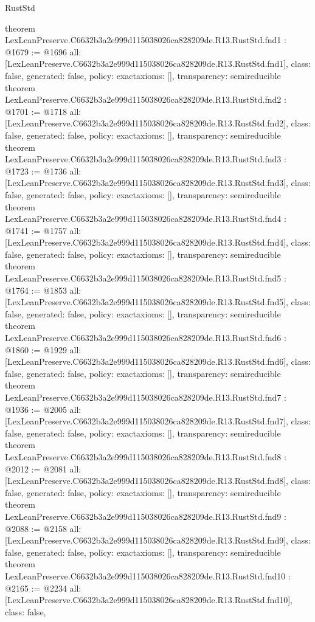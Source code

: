 \begin{lexlean}{RustStd}
\begin{coremodule}
{}
theorem LexLeanPreserve.C6632b3a2e999d115038026ca828209de.R13.RustStd.fnd1 : @1679 := @1696 {
  all: [LexLeanPreserve.C6632b3a2e999d115038026ca828209de.R13.RustStd.fnd1],
  class: false,
  generated: false,
  policy: exact{axioms: []},
  transparency: semireducible
}
theorem LexLeanPreserve.C6632b3a2e999d115038026ca828209de.R13.RustStd.fnd2 : @1701 := @1718 {
  all: [LexLeanPreserve.C6632b3a2e999d115038026ca828209de.R13.RustStd.fnd2],
  class: false,
  generated: false,
  policy: exact{axioms: []},
  transparency: semireducible
}
theorem LexLeanPreserve.C6632b3a2e999d115038026ca828209de.R13.RustStd.fnd3 : @1723 := @1736 {
  all: [LexLeanPreserve.C6632b3a2e999d115038026ca828209de.R13.RustStd.fnd3],
  class: false,
  generated: false,
  policy: exact{axioms: []},
  transparency: semireducible
}
theorem LexLeanPreserve.C6632b3a2e999d115038026ca828209de.R13.RustStd.fnd4 : @1741 := @1757 {
  all: [LexLeanPreserve.C6632b3a2e999d115038026ca828209de.R13.RustStd.fnd4],
  class: false,
  generated: false,
  policy: exact{axioms: []},
  transparency: semireducible
}
theorem LexLeanPreserve.C6632b3a2e999d115038026ca828209de.R13.RustStd.fnd5 : @1764 := @1853 {
  all: [LexLeanPreserve.C6632b3a2e999d115038026ca828209de.R13.RustStd.fnd5],
  class: false,
  generated: false,
  policy: exact{axioms: []},
  transparency: semireducible
}
theorem LexLeanPreserve.C6632b3a2e999d115038026ca828209de.R13.RustStd.fnd6 : @1860 := @1929 {
  all: [LexLeanPreserve.C6632b3a2e999d115038026ca828209de.R13.RustStd.fnd6],
  class: false,
  generated: false,
  policy: exact{axioms: []},
  transparency: semireducible
}
theorem LexLeanPreserve.C6632b3a2e999d115038026ca828209de.R13.RustStd.fnd7 : @1936 := @2005 {
  all: [LexLeanPreserve.C6632b3a2e999d115038026ca828209de.R13.RustStd.fnd7],
  class: false,
  generated: false,
  policy: exact{axioms: []},
  transparency: semireducible
}
theorem LexLeanPreserve.C6632b3a2e999d115038026ca828209de.R13.RustStd.fnd8 : @2012 := @2081 {
  all: [LexLeanPreserve.C6632b3a2e999d115038026ca828209de.R13.RustStd.fnd8],
  class: false,
  generated: false,
  policy: exact{axioms: []},
  transparency: semireducible
}
theorem LexLeanPreserve.C6632b3a2e999d115038026ca828209de.R13.RustStd.fnd9 : @2088 := @2158 {
  all: [LexLeanPreserve.C6632b3a2e999d115038026ca828209de.R13.RustStd.fnd9],
  class: false,
  generated: false,
  policy: exact{axioms: []},
  transparency: semireducible
}
theorem LexLeanPreserve.C6632b3a2e999d115038026ca828209de.R13.RustStd.fnd10 : @2165 := @2234 {
  all: [LexLeanPreserve.C6632b3a2e999d115038026ca828209de.R13.RustStd.fnd10],
  class: false,
}
\end{coremodule}
\end{lexlean}
